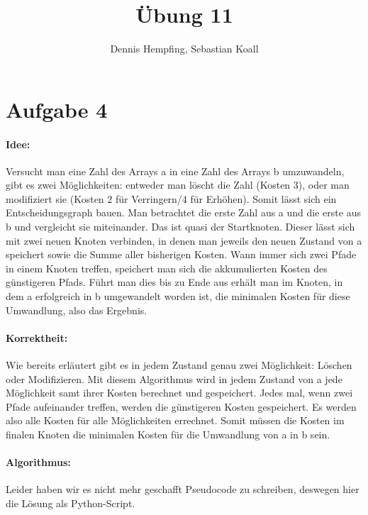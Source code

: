 \documentclass[12pt]{scrartcl}%
\theoremstyle{nonumberplain}
\begin{document}
\author{Dennis Hempfing, Sebastian Koall}
\title{Übung 11}
\date{} 
\pagestyle{myheadings}

\maketitle %

\section*{Aufgabe 4}

\paragraph{Idee:} Versucht man eine Zahl des Arrays a in eine Zahl des Arrays b umzuwandeln, gibt es zwei Möglichkeiten: entweder man löscht die Zahl (Kosten 3), oder man modifiziert sie (Kosten 2 für Verringern/4 für Erhöhen). Somit lässt sich ein Entscheidungsgraph bauen. Man betrachtet die erste Zahl aus a und die erste aus b und vergleicht sie miteinander. Das ist quasi der Startknoten. Dieser lässt sich mit zwei neuen Knoten verbinden, in denen man jeweils den neuen Zustand von a speichert sowie die Summe aller bisherigen Kosten. Wann immer sich zwei Pfade in einem Knoten treffen, speichert man sich die akkumulierten Kosten des günstigeren Pfads. Führt man dies bis zu Ende aus erhält man im Knoten, in dem a erfolgreich in b umgewandelt worden ist, die minimalen Kosten für diese Umwandlung, also das Ergebnis.

\paragraph{Korrektheit:} Wie bereits erläutert gibt es in jedem Zustand genau zwei Möglichkeit: Löschen oder Modifizieren. Mit diesem Algorithmus wird in jedem Zustand von a jede Möglichkeit samt ihrer Kosten berechnet und gespeichert. Jedes mal, wenn zwei Pfade aufeinander treffen, werden die günstigeren Kosten gespeichert. Es werden also alle Kosten für alle Möglichkeiten errechnet. Somit müssen die Kosten im finalen Knoten die minimalen Kosten für die Umwandlung von a in b sein.

\paragraph{Algorithmus:} Leider haben wir es nicht mehr geschafft Pseudocode zu schreiben, deswegen hier die Lösung als Python-Script.
\end{document}
